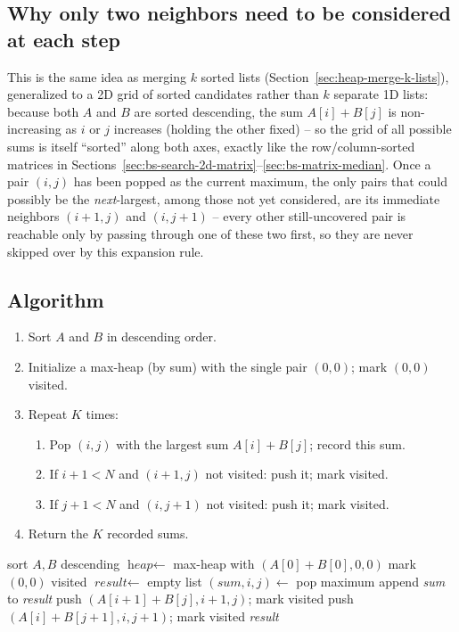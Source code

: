 \subsection*{Why only two neighbors need to be considered at each step}

This is the same idea as merging $k$ sorted lists
(Section~\ref{sec:heap-merge-k-lists}), generalized to a 2D grid of sorted
candidates rather than $k$ separate 1D lists: because both $A$ and $B$ are
sorted descending, the sum $A[i]+B[j]$ is non-increasing as $i$ or $j$
increases (holding the other fixed) -- so the grid of all possible sums is
itself ``sorted'' along both axes, exactly like the row/column-sorted
matrices in Sections~\ref{sec:bs-search-2d-matrix}--\ref{sec:bs-matrix-median}.
Once a pair $(i,j)$ has been popped as the current maximum, the only pairs
that could possibly be the \emph{next}-largest, among those not yet
considered, are its immediate neighbors $(i+1,j)$ and $(i,j+1)$ -- every
other still-uncovered pair is reachable only by passing through one of
these two first, so they are never skipped over by this expansion rule.

\subsection*{Algorithm}

\begin{enumerate}
  \item Sort $A$ and $B$ in descending order.
  \item Initialize a max-heap (by sum) with the single pair $(0,0)$;
        mark $(0,0)$ visited.
  \item Repeat $K$ times:
  \begin{enumerate}
    \item Pop $(i,j)$ with the largest sum $A[i]+B[j]$; record this sum.
    \item If $i+1 < N$ and $(i+1,j)$ not visited: push it; mark
          visited.
    \item If $j+1 < N$ and $(i,j+1)$ not visited: push it; mark
          visited.
  \end{enumerate}
  \item Return the $K$ recorded sums.
\end{enumerate}

\begin{algorithm}[H]
\caption{Maximum Sum Combination}
\begin{algorithmic}[1]
  \State sort $A, B$ descending
  \State $\textit{heap} \gets$ max-heap with $(A[0]+B[0], 0, 0)$
  \State mark $(0,0)$ visited
  \State $\textit{result} \gets$ empty list
    \State $(\textit{sum}, i, j) \gets$ pop maximum
    \State append \textit{sum} to \textit{result}
      \State push $(A[i{+}1]+B[j], i{+}1, j)$; mark visited
    \EndIf
      \State push $(A[i]+B[j{+}1], i, j{+}1)$; mark visited
    \EndIf
  \EndFor
  \State \Return \textit{result}
\EndProcedure
\end{algorithmic}
\end{algorithm}

